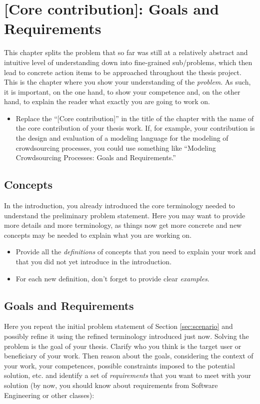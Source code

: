 \chapter{[Core contribution]: Goals and Requirements}
\label{chapter3}
\thispagestyle{empty}


This chapter splits the problem that so far was still at a relatively abstract and intuitive level of understanding down into fine-grained sub/problems, which then lead to concrete action items to be approached throughout the thesis project. This is the chapter where you show your understanding of the \emph{problem}. As such, it is important, on the one hand, to show your competence and, on the other hand, to explain the reader what exactly you are going to work on.

\begin{itemize}
\item[\Square] Replace the ``[Core contribution]'' in the title of the chapter with the name of the core contribution of your thesis work. If, for example, your contribution is the design and evaluation of a modeling language for the modeling of crowdsourcing processes, you could use something like ``Modeling Crowdsourcing Processes: Goals and Requirements.''
\end{itemize}



\section{Concepts}
In the introduction, you already introduced the core terminology needed to understand the preliminary problem statement. Here you may want to provide more details and more terminology, as things now get more concrete and new concepts may be needed to explain what you are working on.

\begin{itemize}
\item[\Square] Provide all the \emph{definitions} of concepts that you need to explain your work and that you did not yet introduce in the introduction.
\item[\Square] For each new definition, don't forget to provide clear \emph{examples}. 
\end{itemize}



\section{Goals and Requirements}
Here you repeat the initial problem statement of Section \ref{sec:scenario} and possibly refine it using the refined terminology introduced just now. Solving the problem is the goal of your thesis. Clarify who you think is the target user or beneficiary of your work. Then reason about the goals, considering the context of your work, your competences, possible constraints imposed to the potential solution, etc. and identify a set of \emph{requirements} that you want to meet with your solution (by now, you should know about requirements from Software Engineering or other classes):

